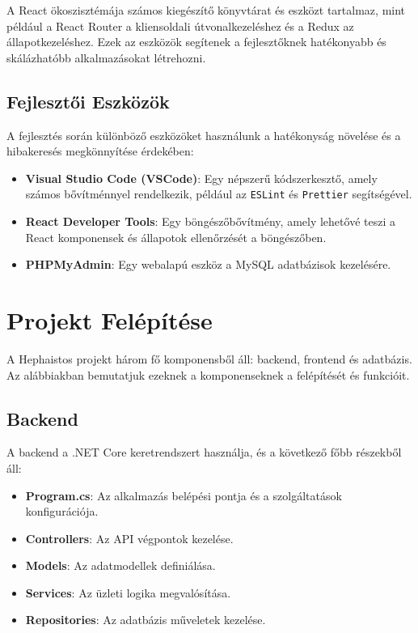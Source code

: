 \documentclass{article}
\begin{document}
A React ökoszisztémája számos kiegészítő könyvtárat és eszközt tartalmaz, mint például a React Router a kliensoldali útvonalkezeléshez és a Redux az állapotkezeléshez. Ezek az eszközök segítenek a fejlesztőknek hatékonyabb és skálázhatóbb alkalmazásokat létrehozni.

\subsection{Fejlesztői Eszközök}
A fejlesztés során különböző eszközöket használunk a hatékonyság növelése és a hibakeresés megkönnyítése érdekében:
\begin{itemize}
    \item \textbf{Visual Studio Code (VSCode)}: Egy népszerű kódszerkesztő, amely számos bővítménnyel rendelkezik, például az \texttt{ESLint} és \texttt{Prettier} segítségével.
    \item \textbf{React Developer Tools}: Egy böngészőbővítmény, amely lehetővé teszi a React komponensek és állapotok ellenőrzését a böngészőben.
    \item \textbf{PHPMyAdmin}: Egy webalapú eszköz a MySQL adatbázisok kezelésére.
\end{itemize}

\section{Projekt Felépítése}
A Hephaistos projekt három fő komponensből áll: backend, frontend és adatbázis. Az alábbiakban bemutatjuk ezeknek a komponenseknek a felépítését és funkcióit.

\subsection{Backend}
A backend a .NET Core keretrendszert használja, és a következő főbb részekből áll:
\begin{itemize}
    \item \textbf{Program.cs}: Az alkalmazás belépési pontja és a szolgáltatások konfigurációja.
    \item \textbf{Controllers}: Az API végpontok kezelése.
    \item \textbf{Models}: Az adatmodellek definiálása.
    \item \textbf{Services}: Az üzleti logika megvalósítása.
    \item \textbf{Repositories}: Az adatbázis műveletek kezelése.
\end{itemize}
\end{document}

